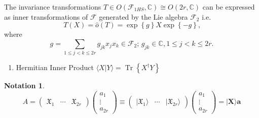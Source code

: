 \documentclass[aps, preprint]{revtex4}
\newtheorem{notation}[theorem]{Notation}
\begin{document}
The invariance transformations $T \in O \left (\mathcal{F}_{1 H S} ,\mathbb{C}\right ) \cong O \left (2 r ,\mathbb{C}\right )$ can be expressed as inner transformations of $\mathcal{F}$ generated by the Lie algebra $\mathcal{F}_{2}$ i.e.
\begin{equation}T \left (X\right ) =\widehat{o} \left (T\right ) =\exp  \left \{g\right \} X \exp  \left \{ -g\right \}\text{,}
\end{equation}where
\begin{equation}g =\sum _{1 \leq j <k \leq 2 r}g_{j k} x_{j} x_{k} \in \mathcal{F}_{2} ;\,g_{j k} \in \mathbb{C} ,1 \leq j <k \leq 2 r\text{.}
\end{equation}


\begin{enumerate}
\item [2] Hermitian Inner Product $ \langle \left .X\right \vert Y \rangle  =\ensuremath{\operatorname*{Tr}} \left \{X^{ \dag } Y\right \}$ \end{enumerate}



\begin{notation}
\begin{equation}A =\left (\begin{array}{ccc}\mathfrak{X}_{1} & \cdots  & \mathfrak{X}_{2 r}\end{array}\right ) \left (\begin{array}{c}a_{1} \\
\vdots  \\
a_{2 r}\end{array}\right ) \equiv \left (\begin{array}{ccc}\vert \mathfrak{X}_{1} \rangle  & \cdots  & \vert \mathfrak{X}_{2 r} \rangle \end{array}\right ) \left (\begin{array}{c}a_{1} \\
\vdots  \\
a_{2 r}\end{array}\right ) =\vert \mathbf{X} \rangle \mathbf{a}
\end{equation}
\end{notation}
\end{document}

